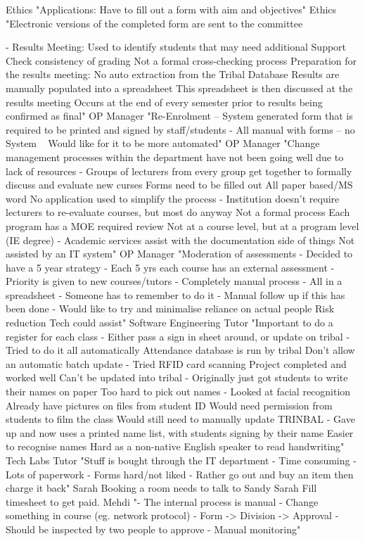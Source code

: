 Ethics	"Applications:
Have to fill out a form with aim and objectives"
Ethics	"Electronic versions of the completed form are sent to the committee

- Results Meeting:
     Used to identify students that may need additional Support
     Check consistency of grading
     Not a formal cross-checking process
     Preparation for the results meeting:
       No auto extraction from the Tribal Database
       Results are manually populated into a spreadsheet
       This spreadsheet is then discussed at the results meeting
       Occurs at the end of every semester prior to results being confirmed as final"
OP Manager	"Re-Enrolment – System generated form that is required to be printed and signed by staff/students
- All manual with forms – no System
   Would like for it to be more automated"
OP Manager	"Change management processes within the department have not been going well due to lack of resources
  - Groups of lecturers from every group get together to formally discuss and evaluate new curses
      Forms need to be filled out
      All paper based/MS word
      No application used to simplify the process
  - Institution doesn’t require lecturers to re-evaluate courses, but most do anyway
      Not a formal process
      Each program has a MOE required review
      Not at a course level, but at a program level (IE degree)
  - Academic services assist with the documentation side of things
      Not assisted by an IT system"
OP Manager	"Moderation of assessments
  - Decided to have a 5 year strategy
  - Each 5 yrs each course has an external assessment
  - Priority is given to new courses/tutors
  - Completely manual process
  - All in a spreadsheet
  - Someone has to remember to do it
  - Manual follow up if this has been done
  - Would like to try and minimalise reliance on actual people 
      Risk reduction
      Tech could assist"
Software Engineering Tutor	"Important to do a register for each class
  - Either pass a sign in sheet around, or update on tribal
  - Tried to do it all automatically
      Attendance database is run by tribal
      Don’t allow an automatic batch update
  - Tried RFID card scanning
      Project completed and worked well
        Can’t be updated into tribal
  - Originally just got students to write their names on paper
      Too hard to pick out names
  - Looked at facial recognition
      Already have pictures on files from student ID
      Would need permission from students to film the class
      Would still need to manually update TRINBAL
  - Gave up and now uses a printed name list, with students signing by their name
      Easier to recognise names
      Hard as a non-native English speaker to read handwriting"
Tech Labs Tutor	"Stuff is bought through the IT department
- Time consuming
- Lots of paperwork
- Forms hard/not liked
- Rather go out and buy an item then charge it back"
Sarah	Booking a room needs to talk to Sandy 
Sarah	Fill timesheet to get paid.
Mehdi	"-	The internal process is manual
-	Change something in course (eg. network protocol)
-	Form -> Division -> Approval
-	Should be inspected by two people to approve
-	Manual monitoring"

